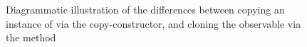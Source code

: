 \begin{figure}
    \caption{%
        Diagrammatic illustration of the differences between copying an instance of
         via the copy-constructor, and cloning the observable via the 
        method
    }
\end{figure}
